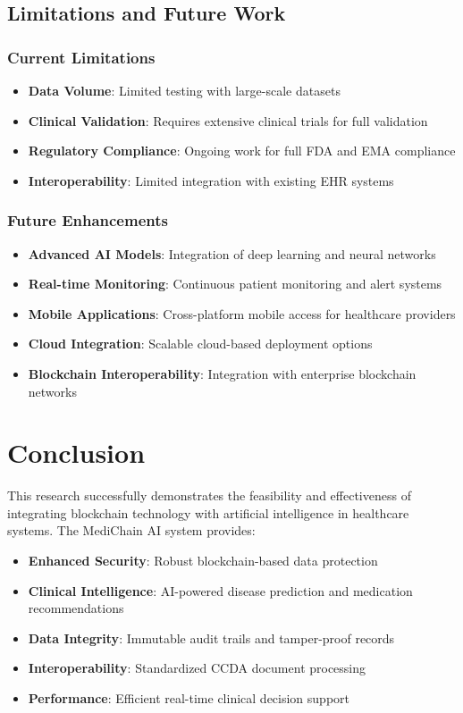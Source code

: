 \documentclass[12pt,a4paper]{article}
\begin{document}
\subsection{Limitations and Future Work}

\subsubsection{Current Limitations}
\begin{itemize}
    \item \textbf{Data Volume}: Limited testing with large-scale datasets
    \item \textbf{Clinical Validation}: Requires extensive clinical trials for full validation
    \item \textbf{Regulatory Compliance}: Ongoing work for full FDA and EMA compliance
    \item \textbf{Interoperability}: Limited integration with existing EHR systems
\end{itemize}

\subsubsection{Future Enhancements}
\begin{itemize}
    \item \textbf{Advanced AI Models}: Integration of deep learning and neural networks
    \item \textbf{Real-time Monitoring}: Continuous patient monitoring and alert systems
    \item \textbf{Mobile Applications}: Cross-platform mobile access for healthcare providers
    \item \textbf{Cloud Integration}: Scalable cloud-based deployment options
    \item \textbf{Blockchain Interoperability}: Integration with enterprise blockchain networks
\end{itemize}

\section{Conclusion}

This research successfully demonstrates the feasibility and effectiveness of integrating blockchain technology with artificial intelligence in healthcare systems. The MediChain AI system provides:

\begin{itemize}
    \item \textbf{Enhanced Security}: Robust blockchain-based data protection
    \item \textbf{Clinical Intelligence}: AI-powered disease prediction and medication recommendations
    \item \textbf{Data Integrity}: Immutable audit trails and tamper-proof records
    \item \textbf{Interoperability}: Standardized CCDA document processing
    \item \textbf{Performance}: Efficient real-time clinical decision support
\end{itemize}
\end{document}
